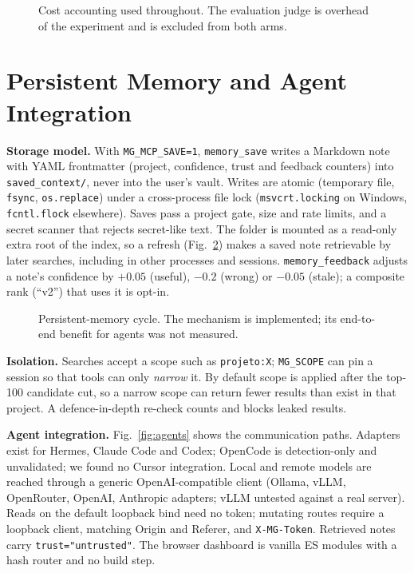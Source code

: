 \documentclass[conference,onecolumn,11pt]{IEEEtran}
\begin{document}
\begin{figure}[!htbp]\centering
{}
\caption{Cost accounting used throughout. The evaluation judge is overhead of the experiment and is excluded from both arms.}\label{fig:costacct}
\end{figure}

\section{Persistent Memory and Agent Integration}\label{sec:persist}
\textbf{Storage model.} With \texttt{MG\_MCP\_SAVE=1}, \texttt{memory\_save} writes a Markdown note with YAML frontmatter (project, confidence, trust and feedback counters) into \texttt{saved\_context/}, never into the user's vault. Writes are atomic (temporary file, \texttt{fsync}, \texttt{os.replace}) under a cross-process file lock (\texttt{msvcrt.locking} on Windows, \texttt{fcntl.flock} elsewhere). Saves pass a project gate, size and rate limits, and a secret scanner that rejects secret-like text. The folder is mounted as a read-only extra root of the index, so a refresh (Fig.~\ref{fig:persist}) makes a saved note retrievable by later searches, including in other processes and sessions. \texttt{memory\_feedback} adjusts a note's confidence by $+0.05$ (useful), $-0.2$ (wrong) or $-0.05$ (stale); a composite rank (``v2'') that uses it is opt-in.

\begin{figure}[!htbp]\centering
{}
\caption{Persistent-memory cycle. The mechanism is implemented; its end-to-end benefit for agents was not measured.}\label{fig:persist}
\end{figure}

\textbf{Isolation.} Searches accept a scope such as \texttt{projeto:X}; \texttt{MG\_SCOPE} can pin a session so that tools can only \emph{narrow} it. By default scope is applied after the top-100 candidate cut, so a narrow scope can return fewer results than exist in that project. A defence-in-depth re-check counts and blocks leaked results.

\textbf{Agent integration.} Fig.~\ref{fig:agents} shows the communication paths. Adapters exist for Hermes, Claude Code and Codex; OpenCode is detection-only and unvalidated; we found no Cursor integration. Local and remote models are reached through a generic OpenAI-compatible client (Ollama, vLLM, OpenRouter, OpenAI, Anthropic adapters; vLLM untested against a real server). Reads on the default loopback bind need no token; mutating routes require a loopback client, matching Origin and Referer, and \texttt{X-MG-Token}. Retrieved notes carry \texttt{trust="untrusted"}. The browser dashboard is vanilla ES modules with a hash router and no build step.
\end{document}
